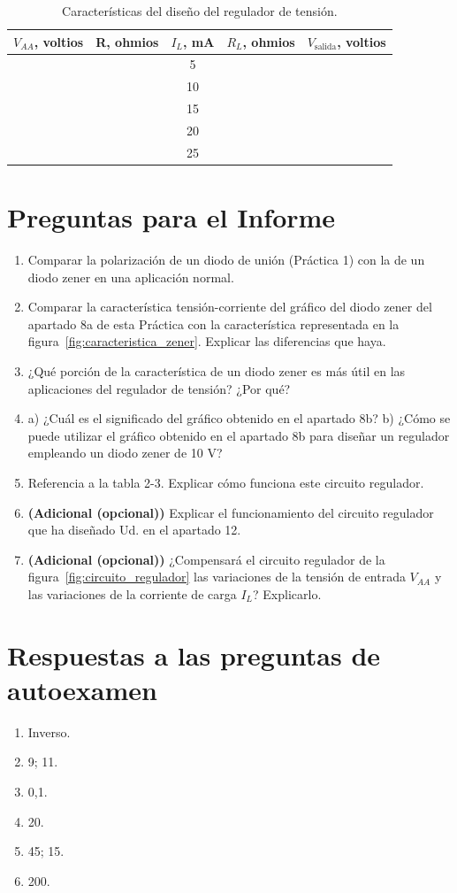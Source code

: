 \documentclass[12pt,a4paper]{article}
\begin{document}
\begin{table}[H]
    \centering
    \caption{Características del diseño del regulador de tensión.}
    \label{tab:diseno_regulador}
    \begin{tabular}{ccccc}
        \toprule
        $V_{AA}$, voltios & R, ohmios & $I_L$, mA & $R_L$, ohmios & $V_{\text{salida}}$, voltios \\
        \midrule
         & & 5 & & \\
         & & 10 & & \\
         & & 15 & & \\
         & & 20 & & \\
         & & 25 & & \\
        \bottomrule
    \end{tabular}
\end{table}

\newpage
\section*{Preguntas para el Informe}
\begin{enumerate}
    \item Comparar la polarización de un diodo de unión (Práctica 1) con la de un diodo zener en una aplicación normal.
    \item Comparar la característica tensión-corriente del gráfico del diodo zener del apartado 8a de esta Práctica con la característica representada en la figura~\ref{fig:caracteristica_zener}. Explicar las diferencias que haya.
    \item ¿Qué porción de la característica de un diodo zener es más útil en las aplicaciones del regulador de tensión? ¿Por qué?
    \item a) ¿Cuál es el significado del gráfico obtenido en el apartado 8b? b) ¿Cómo se puede utilizar el gráfico obtenido en el apartado 8b para diseñar un regulador empleando un diodo zener de 10 V?
    \item Referencia a la tabla 2-3. Explicar cómo funciona este circuito regulador.
    \item[6.] \textbf{(Adicional (opcional))} Explicar el funcionamiento del circuito regulador que ha diseñado Ud. en el apartado 12.
    \item[7.] \textbf{(Adicional (opcional))} ¿Compensará el circuito regulador de la figura~\ref{fig:circuito_regulador} las variaciones de la tensión de entrada $V_{AA}$ y las variaciones de la corriente de carga $I_L$? Explicarlo.
\end{enumerate}

\section*{Respuestas a las preguntas de autoexamen}
\begin{enumerate}
    \item Inverso.
    \item 9; 11.
    \item 0,1.
    \item 20.
    \item 45; 15.
    \item 200.
\end{enumerate}
\end{document}
